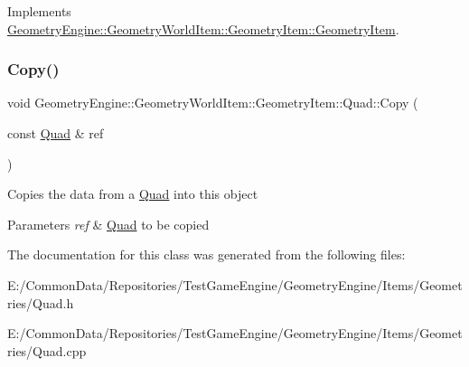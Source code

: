 Implements \mbox{\hyperlink{class_geometry_engine_1_1_geometry_world_item_1_1_geometry_item_1_1_geometry_item_a1db8f97339ba49f746b3e0b4c4b02748}{Geometry\+Engine\+::\+Geometry\+World\+Item\+::\+Geometry\+Item\+::\+Geometry\+Item}}.

\mbox{\label{class_geometry_engine_1_1_geometry_world_item_1_1_geometry_item_1_1_quad_a560a98ecd908921a42b9f1adf93115b3}} 
\subsubsection{\texorpdfstring{Copy()}{Copy()}}
{\footnotesize\ttfamily void Geometry\+Engine\+::\+Geometry\+World\+Item\+::\+Geometry\+Item\+::\+Quad\+::\+Copy (\begin{DoxyParamCaption}\item[{const \mbox{\hyperlink{class_geometry_engine_1_1_geometry_world_item_1_1_geometry_item_1_1_quad}{Quad}} \&}]{ref }\end{DoxyParamCaption})\hspace{0.3cm}{\ttfamily [virtual]}}

Copies the data from a \mbox{\hyperlink{class_geometry_engine_1_1_geometry_world_item_1_1_geometry_item_1_1_quad}{Quad}} into this object 
\begin{DoxyParams}{Parameters}
{\em ref} & \mbox{\hyperlink{class_geometry_engine_1_1_geometry_world_item_1_1_geometry_item_1_1_quad}{Quad}} to be copied \\
\hline
\end{DoxyParams}


The documentation for this class was generated from the following files\+:\begin{DoxyCompactItemize}
\item 
E\+:/\+Common\+Data/\+Repositories/\+Test\+Game\+Engine/\+Geometry\+Engine/\+Items/\+Geometries/Quad.\+h\item 
E\+:/\+Common\+Data/\+Repositories/\+Test\+Game\+Engine/\+Geometry\+Engine/\+Items/\+Geometries/Quad.\+cpp\end{DoxyCompactItemize}
